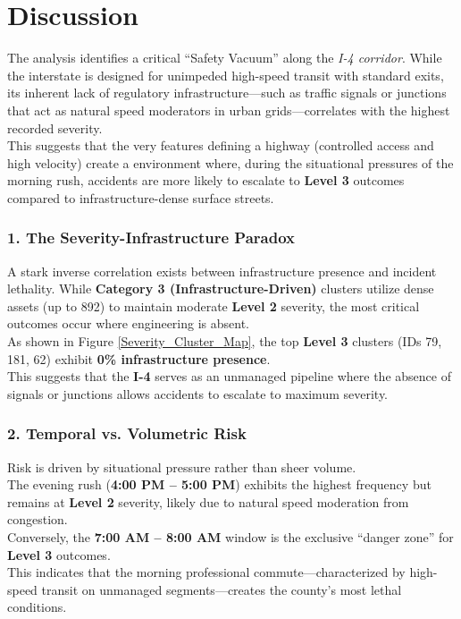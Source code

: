 \documentclass[conference]{IEEEtran}
\begin{document}
\section{\textbf{Discussion}}

The analysis identifies a critical ``Safety Vacuum'' along the \textit{I-4 corridor}. While the interstate is designed for unimpeded high-speed transit with standard exits, its inherent lack of regulatory infrastructure—such as traffic signals or junctions that act as natural speed moderators in urban grids—correlates with the highest recorded severity.\\
\indent This suggests that the very features defining a highway (controlled access and high velocity) create a environment where, during the situational pressures of the morning rush, accidents are more likely to escalate to \textbf{Level 3} outcomes compared to infrastructure-dense surface streets.

\subsubsection*{\textbf{1. The Severity-Infrastructure Paradox}}
A stark inverse correlation exists between infrastructure presence and incident lethality. While \textbf{Category 3 (Infrastructure-Driven)} clusters utilize dense assets (up to 892) to maintain moderate \textbf{Level 2} severity, the most critical outcomes occur where engineering is absent.\\
\indent As shown in Figure \ref{Severity_Cluster_Map}, the top \textbf{Level 3} clusters (IDs 79, 181, 62) exhibit \textbf{0\% infrastructure presence}.\\
\indent This suggests that the \textbf{I-4} serves as an unmanaged pipeline where the absence of signals or junctions allows accidents to escalate to maximum severity.

\subsubsection*{\textbf{2. Temporal vs. Volumetric Risk}}
Risk is driven by situational pressure rather than sheer volume.\\
\indent The evening rush (\textbf{4:00 PM -- 5:00 PM}) exhibits the highest frequency but remains at \textbf{Level 2} severity, likely due to natural speed moderation from congestion.\\
\indent Conversely, the \textbf{7:00 AM -- 8:00 AM} window is the exclusive ``danger zone'' for \textbf{Level 3} outcomes.\\
\indent This indicates that the morning professional commute—characterized by high-speed transit on unmanaged segments—creates the county's most lethal conditions.
\end{document}
